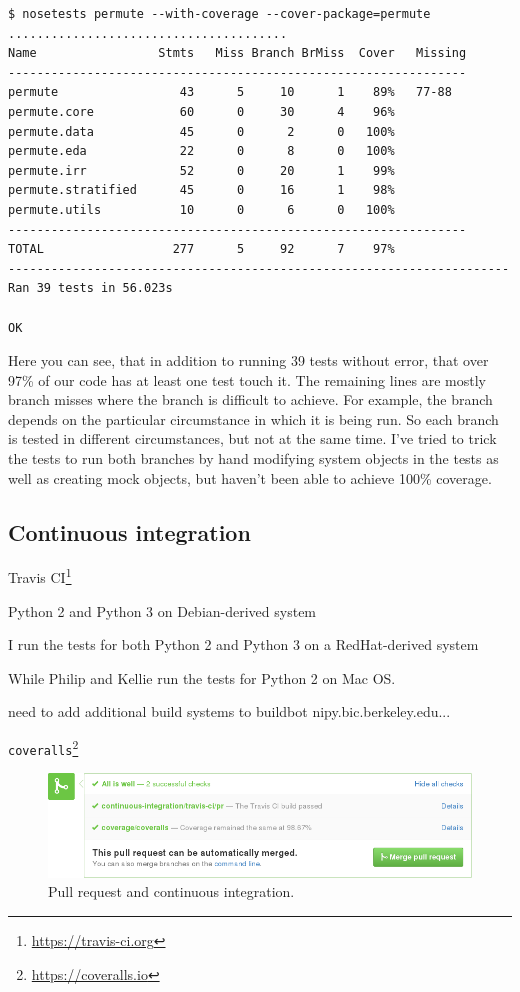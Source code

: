 \begin{verbatim}
$ nosetests permute --with-coverage --cover-package=permute
.......................................
Name                 Stmts   Miss Branch BrMiss  Cover   Missing
----------------------------------------------------------------
permute                 43      5     10      1    89%   77-88
permute.core            60      0     30      4    96%   
permute.data            45      0      2      0   100%   
permute.eda             22      0      8      0   100%   
permute.irr             52      0     20      1    99%   
permute.stratified      45      0     16      1    98%   
permute.utils           10      0      6      0   100%   
----------------------------------------------------------------
TOTAL                  277      5     92      7    97%   
----------------------------------------------------------------------
Ran 39 tests in 56.023s

OK
\end{verbatim}
Here you can see, that in addition to running 39 tests without error,
that over 97\% of our code has at least one test touch it.  The remaining
lines are mostly branch misses where the branch is difficult to achieve.
For example, the branch depends on the particular circumstance in which
it is being run. So each branch is tested in different circumstances, but
not at the same time. I've tried to trick the tests to run both branches by
hand modifying system objects in the tests as well as creating mock objects,
but haven't been able to achieve 100\% coverage.

\subsection{Continuous integration}

Travis CI\footnote{\url{https://travis-ci.org}}

Python 2 and Python 3 on Debian-derived system

I run the tests for both Python 2 and Python 3 on a RedHat-derived system

While Philip and Kellie run the tests for Python 2 on Mac OS.

need to add additional build systems to buildbot nipy.bic.berkeley.edu...

\texttt{coveralls}\footnote{\url{https://coveralls.io}}

\begin{figure}
  \begin{centering}
    \includegraphics[width=5.5in]{fig/pull-request-ci.png}\par
  \end{centering}

  \caption{\label{fig:pull-request}Pull request and continuous integration.}
\end{figure}


